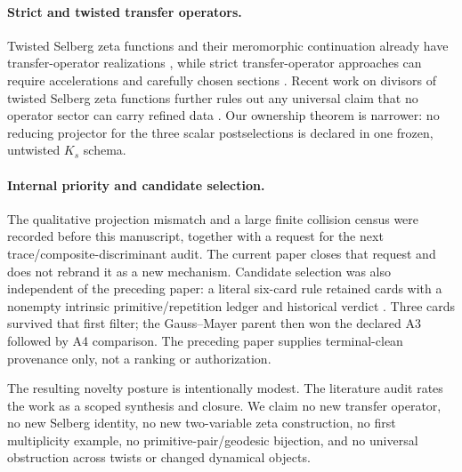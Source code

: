 \paragraph{Strict and twisted transfer operators.}
Twisted Selberg zeta functions and their meromorphic continuation already
have transfer-operator realizations \citep{FedosovaPohl2020Twists}, while
strict transfer-operator approaches can require accelerations and carefully
chosen sections \citep{PohlWabnitz2026Strict}.  Recent work on divisors of
twisted Selberg zeta functions further rules out any universal claim that no
operator sector can carry refined data \citep{DollPohl2026Divisor}.  Our
ownership theorem is narrower: no reducing projector for the three scalar
postselections is declared in one frozen, untwisted $K_s$ schema.

\paragraph{Internal priority and candidate selection.}
The qualitative projection mismatch and a large finite collision census
were recorded before this manuscript, together with a request for the next
trace/composite-discriminant audit.  The current paper closes that request
and does not rebrand it as a new mechanism.  Candidate selection was also
independent of the preceding paper: a literal six-card rule retained cards
with a nonempty intrinsic primitive/repetition ledger and historical verdict
.  Three cards survived that first filter;
the Gauss--Mayer parent then won the declared A3 followed by A4 comparison.
The preceding paper supplies terminal-clean provenance only, not a ranking or
authorization.

The resulting novelty posture is intentionally modest.  The literature audit
rates the work as a scoped synthesis and closure.  We claim no new transfer
operator, no new Selberg identity, no new two-variable zeta construction, no
first multiplicity example, no primitive-pair/geodesic bijection, and no
universal obstruction across twists or changed dynamical objects.
